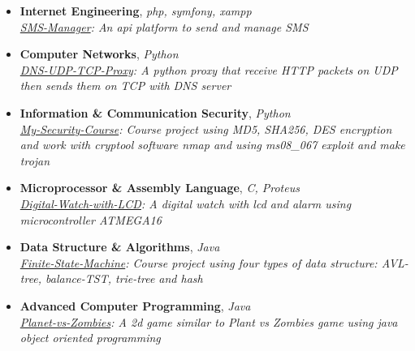 \documentclass[margin]{res}
\begin{document}
\begin{resume}
\begin{itemize} \itemsep +3pt

\item \textbf{Internet Engineering}, {\sl php, symfony, xampp}\\
\textit{\href{https://github.com/aliyazdi75/sms-manager}{SMS-Manager}: An api platform to send and manage SMS}

\item \textbf{Computer Networks}, {\sl Python}\\
\textit{\href{https://github.com/aliyazdi75/DNS-UDP-TCP-Proxy}{DNS-UDP-TCP-Proxy}: A python proxy that receive HTTP packets on UDP then sends them on TCP with DNS server}

\item \textbf{Information \& Communication Security}, {\sl Python}\\
\textit{\href{https://github.com/aliyazdi75/My-Security-Course}{My-Security-Course}: Course project using MD5, SHA256, DES encryption and work with cryptool software nmap and using ms08\_067 exploit and make trojan}

\item \textbf{Microprocessor \& Assembly Language}, {\sl C, Proteus}\\
\textit{\href{https://github.com/aliyazdi75/Digital-Watch-with-LCD}{Digital-Watch-with-LCD}: A digital watch with lcd and alarm using microcontroller ATMEGA16}



\item \textbf{Data Structure \& Algorithms}, {\sl Java}\\
\textit{\href{https://github.com/aliyazdi75/Finite-State-Machine}{Finite-State-Machine}: Course project using four types of data structure: AVL-tree, balance-TST, trie-tree and hash}

\item \textbf{Advanced Computer Programming}, {\sl Java}\\
\textit{\href{https://github.com/aliyazdi75/Planet\_vs\_Zombies}{Planet-vs-Zombies}: A 2d game similar to Plant vs Zombies game using java object oriented programming}


\end{itemize}
\end{resume}
\end{document}
